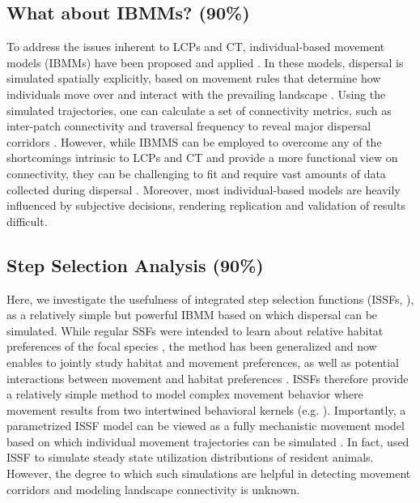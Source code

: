 \documentclass[abstract=on,10pt,a4paper,bibliography=totocnumbered]{article}
\begin{document}
\subsection{What about IBMMs? (90\%)}
To address the issues inherent to LCPs and CT, individual-based movement models
(IBMMs) have been proposed and applied \citep{Diniz.2020}. In these models,
dispersal is simulated spatially explicitly, based on movement rules that
determine how individuals move over and interact with the prevailing landscape
\citep{Gustafson.1996, Gardner.2004, Graf.2007, KramerSchadt.2004, Revilla.2004,
Revilla.2008, Kanagaraj.2013, Clark.2015, Allen.2016, Hauenstein.2019,
Zeller.2020, Vasudev.2021}. Using the simulated trajectories, one can calculate
a set of connectivity metrics, such as inter-patch connectivity and traversal
frequency to reveal major dispersal corridors \citep{Kanagaraj.2013,
BastilleRousseau.2018, Hauenstein.2019, Zeller.2020}. However, while IBMMS can
be employed to overcome any of the shortcomings intrinsic to LCPs and CT and
provide a more functional view on connectivity, they can be challenging to fit
and require vast amounts of data collected during dispersal \citep{Diniz.2020}.
Moreover, most individual-based models are heavily influenced by subjective
decisions, rendering replication and validation of results difficult.

\subsection{Step Selection Analysis (90\%)}
Here, we investigate the usefulness of integrated step selection functions
(ISSFs, \citealp{Avgar.2016}), as a relatively simple but powerful IBMM based on
which dispersal can be simulated. While regular SSFs were intended to learn
about relative habitat preferences of the focal species \citep{Fortin.2005,
Thurfjell.2014, Avgar.2017}, the method has been generalized and now enables to
jointly study habitat and movement preferences, as well as potential
interactions between movement and habitat preferences \citep{Avgar.2016,
Signer.2017, Fieberg.2020}. ISSFs therefore provide a relatively simple method
to model complex movement behavior where movement results from two intertwined
behavioral kernels (e.g. \citealp{Prokopenko.2017, Munden.2020}). Importantly, a
parametrized ISSF model can be viewed as a fully mechanistic movement model
based on which individual movement trajectories can be simulated
\citep{Avgar.2016, Signer.2017}. In fact, \cite{Signer.2017} used ISSF to
simulate steady state utilization distributions of resident animals. However,
the degree to which such simulations are helpful in detecting movement corridors
and modeling landscape connectivity is unknown.
\end{document}
